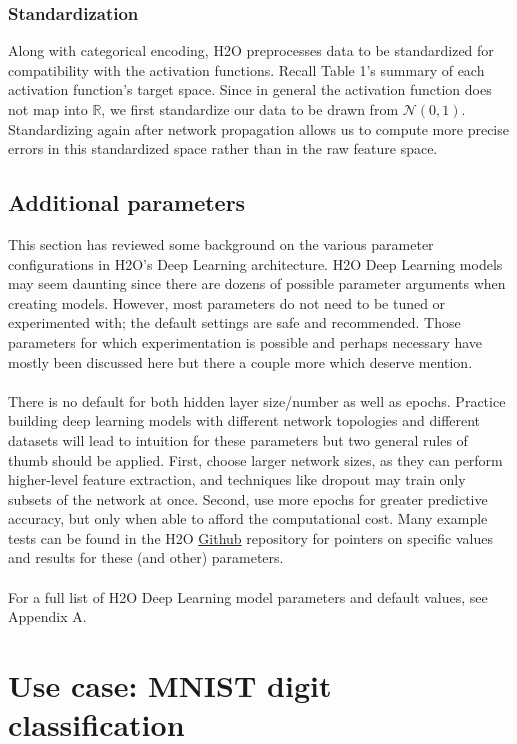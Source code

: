 \documentclass[11pt]{article}
\begin{document}
\subsubsection{Standardization} \label{2.5.1}

Along with categorical encoding, H2O preprocesses data to be standardized for compatibility with the activation functions. Recall Table 1's summary of each activation function's target space. Since in general the activation function does not map into $\mathbb{R}$, we first standardize our data to be drawn from $\mathcal{N}(0,1)$. Standardizing again after network propagation allows us to compute more precise errors in this standardized space rather than in the raw feature space. 

\subsection{Additional parameters} \label{2.6}

This section has reviewed some background on the various parameter configurations in H2O's Deep Learning architecture. H2O Deep Learning models may seem daunting since there are dozens of possible parameter arguments when creating models. However, most parameters do not need to be tuned or experimented with; the default settings are safe and recommended. Those parameters for which experimentation is possible and perhaps necessary have mostly been discussed here but there a couple more which deserve mention.
\\
\\
There is no default for both hidden layer size/number as well as epochs. Practice building deep learning models with different network topologies and different datasets will lead to intuition for these parameters but two general rules of thumb should be applied. First, choose larger network sizes, as they can perform higher-level feature extraction, and techniques like dropout may train only subsets of the network at once. Second, use more epochs for greater predictive accuracy, but only when able to afford the computational cost. Many example tests can be found in the H2O \href{https://github.com/0xdata/h2o/}{Github} repository for pointers on specific values and results for these (and other) parameters.
\\
\\
For a full list of H2O Deep Learning model parameters and default values, see Appendix A. 

\section{Use case: MNIST digit classification} \label{3}
\end{document}
